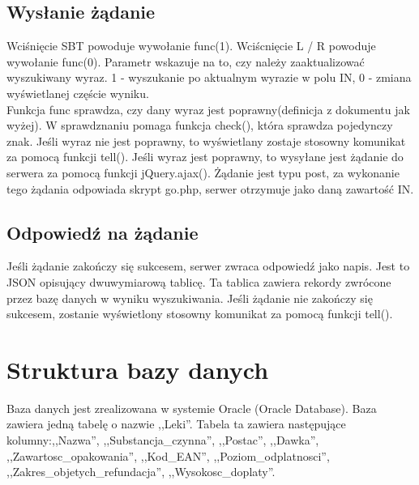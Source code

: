 \documentclass[10pt, a4paper]{article}
\begin{document}
\subsection{Wysłanie żądanie}
Wciśnięcie SBT powoduje wywołanie func(1).
Wciścnięcie L / R powoduje wywołanie func(0).
Parametr wskazuje na to, czy należy zaaktualizować wyszukiwany wyraz. 1 - wyszukanie po aktualnym wyrazie w polu IN, 0 - zmiana wyświetlanej częście wyniku. \\
Funkcja func sprawdza, czy dany wyraz jest poprawny(definicja z dokumentu jak wyżej). W sprawdznaniu pomaga funkcja check(), która sprawdza pojedynczy znak. Jeśli wyraz nie jest poprawny, to wyświetlany zostaje stosowny komunikat za pomocą funkcji tell(). Jeśli wyraz jest poprawny, to wysyłane jest żądanie do serwera za pomocą funkcji jQuery.ajax(). Żądanie jest typu post, za wykonanie tego żądania odpowiada skrypt go.php, serwer otrzymuje jako daną zawartość IN.
\subsection{Odpowiedź na żądanie}
Jeśli żądanie zakończy się sukcesem, serwer zwraca odpowiedź jako napis. Jest to JSON opisujący dwuwymiarową tablicę. Ta tablica zawiera rekordy zwrócone przez bazę danych w wyniku wyszukiwania.
Jeśli żądanie nie zakończy się sukcesem, zostanie wyświetlony stosowny komunikat za pomocą funkcji tell().

\section{Struktura bazy danych}
Baza danych jest zrealizowana w systemie Oracle (Oracle Database).
Baza zawiera jedną tabelę o nazwie ,,Leki''. Tabela ta zawiera następujące kolumny:,,Nazwa'', ,,Substancja\_czynna'',  ,,Postac'', ,,Dawka'', ,,Zawartosc\_opakowania'', ,,Kod\_EAN'', ,,Poziom\_odplatnosci'', ,,Zakres\_objetych\_refundacja'', ,,Wysokosc\_doplaty''.
\end{document}
